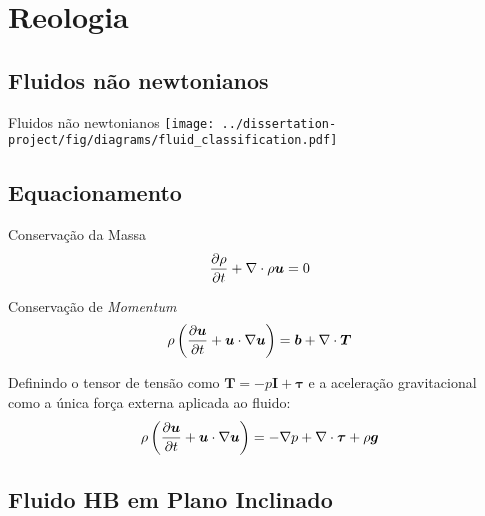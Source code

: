 \section{Reologia}

\subsection{Fluidos não newtonianos}
\begin{frame}{Fluidos não newtonianos}
    \texttt{[image: ../dissertation-project/fig/diagrams/fluid\_classification.pdf]}
\end{frame}

\subsection{Equacionamento}
\begin{frame}
    \begin{exampleblock}{Conservação da Massa}
        \begin{equation}
            \frac{\partial \rho}{\partial t} + \nabla \cdot \rho \bm{u} = 0
        \end{equation}
    \end{exampleblock}

    \begin{exampleblock}{Conservação de \textit{Momentum}}
        \begin{equation}
            \rho \left( \frac{\partial \bm{u}}{\partial t}  + \bm{u} \cdot \nabla \bm{u} \right) =
            \bm{b} + \nabla \cdot \bm{T}
        \end{equation}
    \end{exampleblock}

    \hspace{0.5cm} Definindo o tensor de tensão como $\bm{T} = -p\bm{I} + \bm{\tau}$ e a 
    aceleração gravitacional como a única força externa aplicada ao fluido:
        \vspace{0.25cm}
        \begin{equation}
            \rho \left( \frac{\partial \bm{u}}{\partial t}  + \bm{u} \cdot \nabla \bm{u} \right) =
            -\nabla p + \nabla \cdot \bm{\tau} + \rho \bm{g}
        \end{equation}
\end{frame}


\subsection{Fluido HB em Plano Inclinado}

